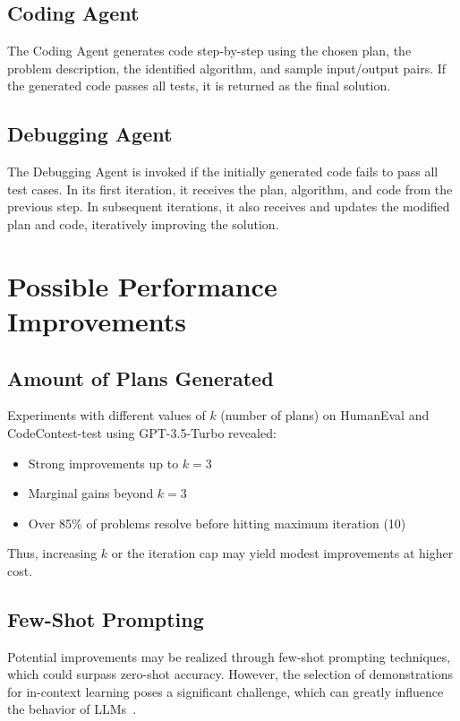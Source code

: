\documentclass[11pt,a4paper]{article}
\begin{document}
\subsection{Coding Agent}
The Coding Agent generates code step-by-step using the chosen plan, the problem description, the identified algorithm, and sample input/output pairs. If the generated code passes all tests, it is returned as the final solution.

\subsection{Debugging Agent}
The Debugging Agent is invoked if the initially generated code fails to pass all test cases. In its first iteration, it receives the plan, algorithm, and code from the previous step. In subsequent iterations, it also receives and updates the modified plan and code, iteratively improving the solution.









\section{Possible Performance Improvements}

\subsection{Amount of Plans Generated}
Experiments with different values of $k$ (number of plans) on HumanEval and CodeContest-test using GPT-3.5-Turbo revealed:

\begin{itemize}
  \item Strong improvements up to $k = 3$
  \item Marginal gains beyond $k = 3$
  \item Over 85\% of problems resolve before hitting maximum iteration (10)
\end{itemize}

Thus, increasing $k$ or the iteration cap may yield modest improvements at higher cost.

\subsection{Few-Shot Prompting}
Potential improvements may be realized through few-shot prompting techniques, which could surpass zero-shot accuracy. However, the selection of demonstrations for in-context learning poses a significant challenge, which can greatly influence the behavior of LLMs~\cite{islam2024mapcodermultiagentcodegeneration}.
\end{document}
